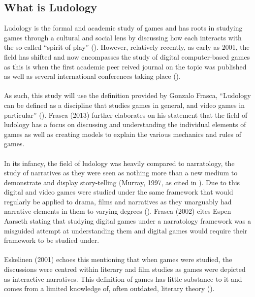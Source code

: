 \subsection{What is Ludology}
Ludology is the formal and academic study of games and has roots in studying games through a cultural and social lens by discussing how each interacts with the so-called “spirit of play” (\cite{Huizinga1949}). However, relatively recently, as early as 2001, the field has shifted and now encompasses the study of digital computer-based games as this is when the first academic peer reived journal on the topic was published as well as several international conferences taking place (\cite{Frasca2013}). 
\\\\
As such, this study will use the definition provided by Gonzalo Frasca, “Ludology can be defined as a discipline that studies games in general, and video games in particular” (\cite{Frasca2013}). Frasca (2013) further elaborates on his statement that the field of ludology has a focus on discussing and understanding the individual elements of games as well as creating models to explain the various mechanics and rules of games. 
\\\\
In its infancy, the field of ludology was heavily compared to narratology, the study of narratives as they were seen as nothing more than a new medium to demonstrate and display story-telling (Murray, 1997, as cited in \cite{Frasca2002}). Due to this digital and video games were studied under the same framework that would regularly be applied to drama, films and narratives as they unarguably had narrative elements in them to varying degrees (\cite{Manovich2002}). Frasca (2002) cites Espen Aarseth stating that studying digital games under a narratology framework was a misguided attempt at understanding them and digital games would require their framework to be studied under. 
\\\\
Eskelinen (2001) echoes this mentioning that when games were studied, the discussions were centred within literary and film studies as games were depicted as interactive narratives. This definition of games has little substance to it and comes from a limited knowledge of, often outdated, literary theory (\cite{Eskelinen2001}).

